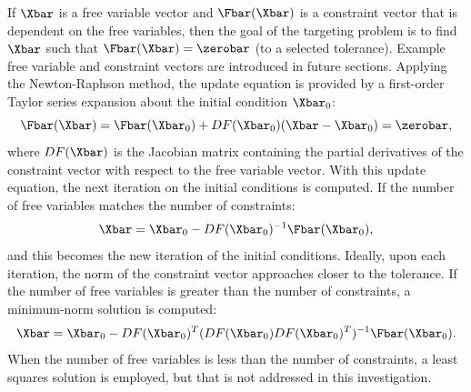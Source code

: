 If $\Xbar$ is a free variable vector and $\Fbar(\Xbar)$ is a constraint vector that is dependent on
the free variables, then the goal of the targeting problem is to find $\Xbar$ such that
$\Fbar(\Xbar)=\zerobar$ (to a selected tolerance). Example free variable and constraint vectors
are introduced in future sections. Applying the Newton-Raphson method, the update equation is
provided by a first-order Taylor series expansion about the initial condition $\Xbar_{0}$:
\begin{equation}
    \Fbar(\Xbar)=\Fbar(\Xbar_{0})+DF(\Xbar_{0})(\Xbar-\Xbar_{0})=\zerobar,
    \label{eq:updateequation}
\end{equation}
where $DF(\Xbar)$ is the Jacobian matrix containing the partial derivatives of the constraint
vector with respect to the free variable vector. With this update equation, the next iteration on
the initial conditions is computed. If the number of free variables matches the number of
constraints:
\begin{equation}
    \Xbar=\Xbar_{0}-DF(\Xbar_{0})^{-1}\Fbar(\Xbar_{0}),
    \label{eq:NRsolution}
\end{equation}
and this becomes the new iteration of the initial conditions. Ideally, upon each iteration, the
norm of the constraint vector approaches closer to the tolerance. If the number of free variables
is greater than the number of constraints, a minimum-norm solution is computed:
\begin{equation}
    \Xbar=\Xbar_{0}-DF(\Xbar_{0})^{T}(DF(\Xbar_{0})DF(\Xbar_{0})^{T})^{-1}\Fbar(\Xbar_{0}).
    \label{eq:minimumnorm}
\end{equation}
When the number of free variables is less than the number of constraints, a least squares solution
is employed, but that is not addressed in this investigation.

